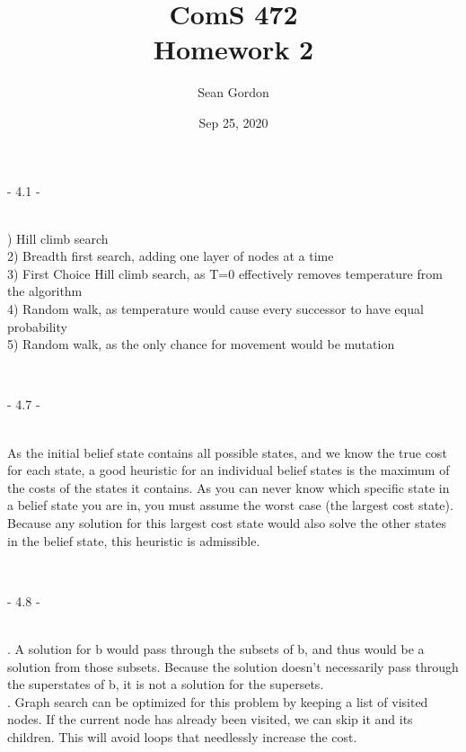 \documentclass[12pt]{article}
\title{ComS 472\\Homework 2}
\author{Sean Gordon}
\date{Sep 25, 2020}
\begin{document}
\maketitle


\centerline{- 4.1 - }
\ \\
) Hill climb search\\
2) Breadth first search, adding one layer of nodes at a time\\
3) First Choice Hill climb search, as T=0 effectively removes temperature from the algorithm\\
4) Random walk, as temperature would cause every successor to have equal probability\\
5) Random walk, as the only chance for movement would be mutation


\noindent \hrulefill \\


\centerline{- 4.7 - }
\ \\
\noindent As the initial belief state contains all possible states, and we know the true cost for each state, a good heuristic for an individual belief states is the maximum of the costs of the states it contains. As you can never know which specific state in a belief state you are in, you must assume the worst case (the largest cost state). Because any solution for this largest cost state would also solve the other states in the belief state, this heuristic is admissible.


\noindent \hrulefill \\



\centerline{- 4.8 - }
\ \\
. A solution for b would pass through the subsets of b, and thus would be a solution from those subsets. Because the solution doesn't necessarily pass through the superstates of b, it is not a solution for the supersets.\\

. Graph search can be optimized for this problem by keeping a list of visited nodes. If the current node has already been visited, we can skip it and its children. This will avoid loops that needlessly increase the cost.\\



\noindent \hrulefill \\\pagebreak
\end{document}
